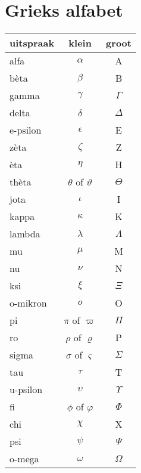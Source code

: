 \documentclass[12pt,twoside,a4]{article}
\begin{document}
\pagebreak
\appendix

\section{Grieks alfabet}

\begin{center}
  \begin{tabular}{lcc}
    \hline
    \bf uitspraak & \bf klein & \bf groot \\
    \hline
    alfa & $\alpha$ & A\\
    b\`eta & $\beta$ & B\\
    gamma & $\gamma$ & $\Gamma$ \\
    delta & $\delta$ & $\Delta$ \\
    e-psilon & $\epsilon$ & E\\
    z\`eta & $\zeta$ & Z\\
    \`eta & $\eta$ & H\\
    th\`eta & $\theta$ of $\vartheta$ & $\Theta$\\
    jota & $\iota$ & I\\
    kappa & $\kappa$ & K\\
    lambda & $\lambda$ & $\Lambda$\\
    mu & $\mu$ & M\\
    nu & $\nu$ & N\\
    ksi & $\xi$ & $\Xi$\\
    o-mikron & $o$ & O\\
    pi & $\pi$ of $\varpi$ & $\Pi$\\
    ro & $\rho$ of $\varrho$ & P\\
    sigma & $\sigma$ of $\varsigma$ & $\Sigma$\\
    tau & $\tau$ & T\\
    u-psilon & $\upsilon$ & $\Upsilon$\\
    fi & $\phi$ of $\varphi$ & $\Phi$\\
    chi & $\chi$ & X\\
    psi & $\psi$ & $\Psi$\\
    o-mega & $\omega$ & $\Omega$\\
    \hline
  \end{tabular}
\end{center}
\end{document}
